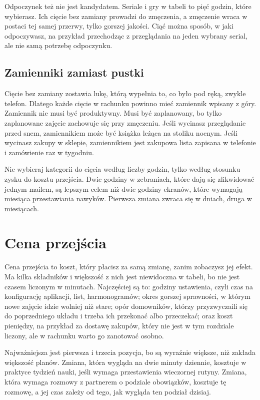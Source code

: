 Odpoczynek też nie jest kandydatem. Seriale i gry w tabeli to pięć godzin, które wybierasz. Ich cięcie bez zamiany prowadzi do zmęczenia, a zmęczenie wraca w postaci tej samej przerwy, tylko gorszej jakości. Ciąć można sposób, w jaki odpoczywasz, na przykład przechodząc z przeglądania na jeden wybrany serial, ale nie samą potrzebę odpoczynku.

\subsection*{Zamienniki zamiast pustki}

Cięcie bez zamiany zostawia lukę, którą wypełnia to, co było pod ręką, zwykle telefon. Dlatego każde cięcie w rachunku powinno mieć zamiennik wpisany z góry. Zamiennik nie musi być produktywny. Musi być zaplanowany, bo tylko zaplanowane zajęcie zachowuje się przy zmęczeniu. Jeśli wycinasz przeglądanie przed snem, zamiennikiem może być książka leżąca na stoliku nocnym. Jeśli wycinasz zakupy w sklepie, zamiennikiem jest zakupowa lista zapisana w telefonie i zamówienie raz w tygodniu.

\begin{zasada}
Nie wybieraj kategorii do cięcia według liczby godzin, tylko według stosunku zysku do kosztu przejścia. Dwie godziny w zebraniach, które dają się zlikwidować jednym mailem, są lepszym celem niż dwie godziny ekranów, które wymagają miesiąca przestawiania nawyków. Pierwsza zmiana zwraca się w dniach, druga w miesiącach.
\end{zasada}

\section{Cena przejścia}

Cena przejścia to koszt, który płacisz za samą zmianę, zanim zobaczysz jej efekt. Ma kilka składników i większość z nich jest niewidoczna w tabeli, bo nie jest czasem liczonym w minutach. Najczęściej są to: godziny ustawienia, czyli czas na konfigurację aplikacji, list, harmonogramów; okres gorszej sprawności, w którym nowe zajęcie idzie wolniej niż stare; opór domowników, którzy przyzwyczaili się do poprzedniego układu i trzeba ich przekonać albo przeczekać; oraz koszt pieniędzy, na przykład za dostawę zakupów, który nie jest w tym rozdziale liczony, ale w rachunku warto go zanotować osobno.

Najważniejsza jest pierwsza i trzecia pozycja, bo są wyraźnie większe, niż zakłada większość planów. Zmiana, która wygląda na dwie minuty dziennie, kosztuje w praktyce tydzień nauki, jeśli wymaga przestawienia wieczornej rutyny. Zmiana, która wymaga rozmowy z partnerem o podziale obowiązków, kosztuje tę rozmowę, a jej czas zależy od tego, jak wygląda ten podział dzisiaj.


